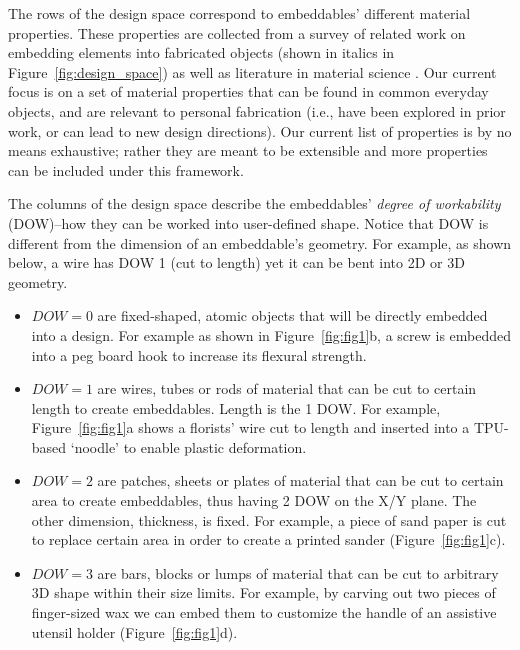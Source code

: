 The rows of the design space correspond to embeddables' different material properties. These properties are collected from a survey of related work on embedding elements into fabricated objects (shown in italics in Figure~\ref{fig:design_space}) as well as literature in material science \cite{jones2011engineering}. Our current focus is on a set of  material properties that can be found in common everyday objects, and are relevant to personal fabrication (i.e., have been explored in prior work, or can lead to new design directions). Our current list of properties is by no means exhaustive; rather they are meant to be extensible and more properties can be included under this framework.

The columns of the design space describe the embeddables' \textit{degree of workability} (DOW)--how they can be worked into user-defined shape.
Notice that DOW is different from the dimension of an embeddable's geometry. For example, as shown below, a wire has DOW 1 (cut to length) yet it can be bent into 2D or 3D geometry.

\begin{itemize}
	\item $DOW=0$ are fixed-shaped, atomic objects that will be directly embedded into a design. For example as shown in Figure~\ref{fig:fig1}b, a screw is embedded into a peg board hook to increase its flexural strength.
	\item $DOW=1$ are wires, tubes or rods of material that can be cut to certain length to create embeddables. Length is the 1 DOW. For example, Figure~\ref{fig:fig1}a shows a florists' wire cut to length and inserted into a TPU-based `noodle' to enable plastic deformation.
	\item $DOW=2$ are patches, sheets or plates of material that can be cut to certain area to create embeddables, thus having 2 DOW on the X/Y plane. The other dimension, thickness, is fixed. For example, a piece of sand paper is cut to replace certain area in order to create a printed sander (Figure~\ref{fig:fig1}c).
	\item $DOW=3$ are bars, blocks or lumps of material that can be cut to arbitrary 3D shape within their size limits. For example, by carving out two pieces of finger-sized wax we can embed them to customize the handle of an assistive utensil holder (Figure~\ref{fig:fig1}d).
\end{itemize}

